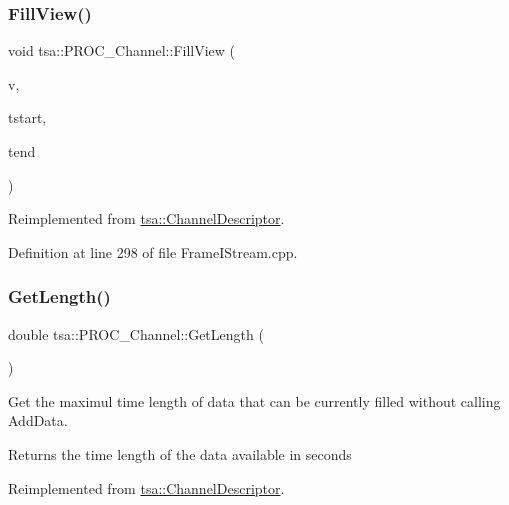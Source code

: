 \subsubsection{\texorpdfstring{Fill\+View()}{FillView()}}
{\footnotesize\ttfamily void tsa\+::\+P\+R\+O\+C\+\_\+\+Channel\+::\+Fill\+View (\begin{DoxyParamCaption}\item[{\hyperlink{namespacetsa_ac599574bcc094eda25613724b8f3ca9e}{Seq\+View\+Double} \&}]{v,  }\item[{double}]{tstart,  }\item[{double}]{tend }\end{DoxyParamCaption})\hspace{0.3cm}{\ttfamily [virtual]}}



Reimplemented from \hyperlink{classtsa_1_1_channel_descriptor_a6553da04ba33471fc5465b6bd2b5275c}{tsa\+::\+Channel\+Descriptor}.



Definition at line 298 of file Frame\+I\+Stream.\+cpp.

\mbox{\label{classtsa_1_1_p_r_o_c___channel_ac29ae55cbededca3814b30e1186a4650}} 
\subsubsection{\texorpdfstring{Get\+Length()}{GetLength()}}
{\footnotesize\ttfamily double tsa\+::\+P\+R\+O\+C\+\_\+\+Channel\+::\+Get\+Length (\begin{DoxyParamCaption}{ }\end{DoxyParamCaption})\hspace{0.3cm}{\ttfamily [virtual]}}

Get the maximul time length of data that can be currently filled without calling Add\+Data.

\begin{DoxyReturn}{Returns}
the time length of the data available in seconds 
\end{DoxyReturn}


Reimplemented from \hyperlink{classtsa_1_1_channel_descriptor_a456d14e6136c389fbd307fabab7d7b73}{tsa\+::\+Channel\+Descriptor}.



